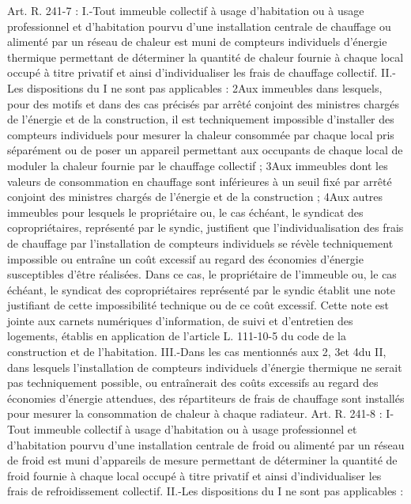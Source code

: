 		Art. R. 241-7 :
		I.-Tout immeuble collectif à usage d'habitation ou à usage professionnel et d'habitation pourvu d'une installation centrale de chauffage ou alimenté par un réseau de chaleur est muni de compteurs individuels d'énergie thermique permettant de déterminer la quantité de chaleur fournie à chaque local occupé à titre privatif et ainsi d'individualiser les frais de chauffage collectif. II.-Les dispositions du I ne sont pas applicables :
		2\degres Aux immeubles dans lesquels, pour des motifs et dans des cas précisés par arrêté conjoint des ministres chargés de l'énergie et de la construction, il est techniquement impossible d'installer des compteurs individuels pour mesurer la chaleur consommée par chaque local pris séparément ou de poser un appareil permettant aux occupants de chaque local de moduler la chaleur fournie par le chauffage collectif ;
		3\degres Aux immeubles dont les valeurs de consommation en chauffage sont inférieures à un seuil fixé par arrêté conjoint des ministres chargés de l'énergie et de la construction ;
		4\degres Aux autres immeubles pour lesquels le propriétaire ou, le cas échéant, le syndicat des copropriétaires, représenté par le syndic, justifient que l'individualisation des frais de chauffage par l'installation de compteurs individuels se révèle techniquement impossible ou entraîne un coût excessif au regard des économies d'énergie susceptibles d'être réalisées. Dans ce cas, le propriétaire de l'immeuble ou, le cas échéant, le syndicat des copropriétaires représenté par le syndic établit une note justifiant de cette impossibilité technique ou de ce coût excessif. Cette note est jointe aux carnets numériques d'information, de suivi et d'entretien des logements, établis en application de l'article L. 111-10-5 du code de la construction et de l'habitation.
		III.-Dans les cas mentionnés aux 2\degres, 3\degres et 4\degres du II, dans lesquels l'installation de compteurs
		individuels d'énergie thermique ne serait pas techniquement possible, ou entraînerait des coûts excessifs au regard des économies d'énergie attendues, des répartiteurs de frais de chauffage sont installés pour mesurer la consommation de chaleur à chaque radiateur.
		Art. R. 241-8 :
		I-Tout immeuble collectif à usage d'habitation ou à usage professionnel et d'habitation pourvu d'une installation centrale de froid ou alimenté par un réseau de froid est muni d'appareils de mesure permettant de déterminer la quantité de froid fournie à chaque local occupé à titre privatif et ainsi d'individualiser les frais de refroidissement collectif. II.-Les dispositions du I ne sont pas applicables :
